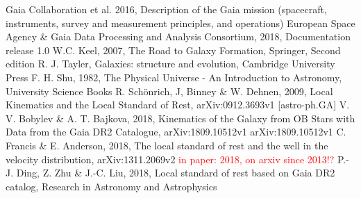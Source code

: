 \documentclass{aastex62}
\begin{document}
	\begin{thebibliography}{}
		
		 Gaia Collaboration et al. 2016, Description of the Gaia mission (spacecraft, instruments, survey and measurement principles, and operations)
		 European Space Agency \& Gaia Data Processing and Analysis Consortium, 2018, Documentation release 1.0
		W.C. Keel, 2007, The Road to Galaxy Formation, Springer, Second edition
		 R. J. Tayler, Galaxies: structure and evolution, Cambridge University Press
		 F. H. Shu, 1982, The Physical Universe - An Introduction to Astronomy, University Science Books
		 R. Sch\"{o}nrich, J, Binney \& W. Dehnen, 2009, Local Kinematics and the Local Standard of Rest, arXiv:0912.3693v1 [astro-ph.GA]
		 V. V. Bobylev \& A. T. Bajkova, 2018, Kinematics of the Galaxy from OB Stars with Data from the Gaia DR2 Catalogue, arXiv:1809.10512v1 arXiv:1809.10512v1
		 C. Francis \& E. Anderson, 2018, The local standard of rest and the well in the velocity distribution, arXiv:1311.2069v2 \textcolor{red}{in paper: 2018, on arxiv since 2013!?}
		 P.-J. Ding, Z. Zhu \& J.-C. Liu, 2018, Local standard of rest based on Gaia DR2 catalog, Research in Astronomy and Astrophysics
		
	\end{thebibliography}
	
\end{document}
